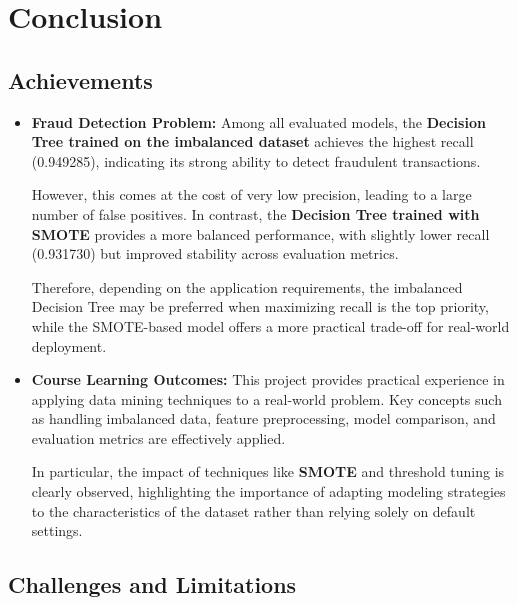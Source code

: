 \newpage
\section{Conclusion}

\subsection{Achievements}

\begin{itemize}
    \item \textbf{Fraud Detection Problem:} Among all evaluated models, the \textbf{Decision Tree trained on the imbalanced dataset} achieves the highest recall (0.949285), indicating its strong ability to detect fraudulent transactions.

However, this comes at the cost of very low precision, leading to a large number of false positives. In contrast, the \textbf{Decision Tree trained with SMOTE} provides a more balanced performance, with slightly lower recall (0.931730) but improved stability across evaluation metrics.

Therefore, depending on the application requirements, the imbalanced Decision Tree may be preferred when maximizing recall is the top priority, while the SMOTE-based model offers a more practical trade-off for real-world deployment.

    \item \textbf{Course Learning Outcomes:} This project provides practical experience in applying data mining techniques to a real-world problem. Key concepts such as handling imbalanced data, feature preprocessing, model comparison, and evaluation metrics are effectively applied.

    In particular, the impact of techniques like \textbf{SMOTE} and threshold tuning is clearly observed, highlighting the importance of adapting modeling strategies to the characteristics of the dataset rather than relying solely on default settings.
\end{itemize}



\subsection{Challenges and Limitations}

